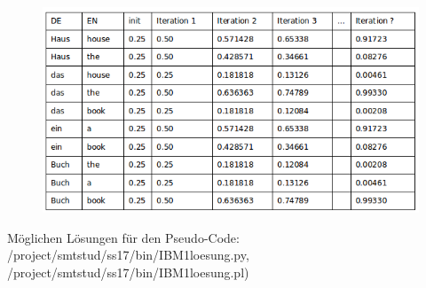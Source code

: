 \documentclass[12pt,fleqn]{article}
\begin{document}
\begin{enumerate}

  \begin{figure} [h]
 \includegraphics[width=15cm]{3_sol.png} 
\end{figure}

\vspace{0.5cm} 
Möglichen Lösungen für den Pseudo-Code: /project/smtstud/ss17/bin/IBM1loesung.py, /project/smtstud/ss17/bin/IBM1loesung.pl)
\end{enumerate}

\newpage



\end{document}
